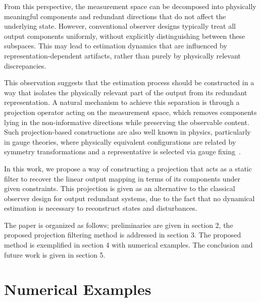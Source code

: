 \documentclass[letterpaper, 10 pt, conference]{ieeeconf}  %
\begin{document}
From this perspective, the measurement space can be decomposed into physically meaningful components and redundant directions that do not affect the underlying state. However, conventional observer designs typically treat all output components uniformly, without explicitly distinguishing between these subspaces. This may lead to estimation dynamics that are influenced by representation-dependent artifacts, rather than purely by physically relevant discrepancies.

This observation suggests that the estimation process should be constructed in a way that isolates the physically relevant part of the output from its redundant representation. A natural mechanism to achieve this separation is through a projection operator acting on the measurement space, which removes components lying in the non-informative directions while preserving the observable content. Such projection-based constructions are also well known in physics, particularly in gauge theories, where physically equivalent configurations are related by symmetry transformations and a representative is selected via gauge fixing~\cite{Peskin1995}.


In this work, we propose a way of constructing a projection that acts as a static filter to recover the linear output mapping in terms of its components under given constraints. This projection is given as an alternative to the classical observer design for output redundant systems, due to the fact that no dynamical estimation is necessary to reconstruct states and disturbances. 

The paper is organized as follows; preliminaries are given in section 2, the proposed projection filtering method is addressed in section 3. The proposed method is exemplified in section 4 with numerical examples. The conclusion and future work is given in section 5.


\section{Numerical Examples}




\addtolength{\textheight}{-12cm}   %
\end{document}
